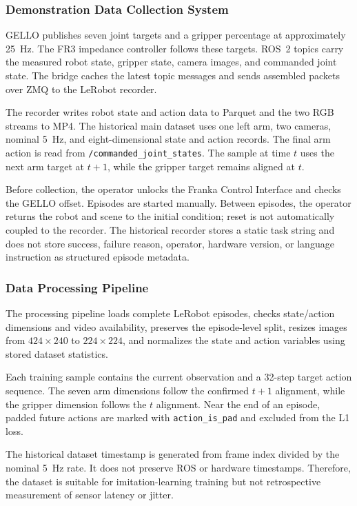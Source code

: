 \documentclass[12pt, letterpaper]{article}
\begin{document}
\subsubsection{Demonstration Data Collection System}

GELLO publishes seven joint targets and a gripper percentage at approximately 25~Hz. The FR3 impedance controller follows these targets. ROS~2 topics carry the measured robot state, gripper state, camera images, and commanded joint state. The bridge caches the latest topic messages and sends assembled packets over ZMQ to the LeRobot recorder.

The recorder writes robot state and action data to Parquet and the two RGB streams to MP4. The historical main dataset uses one left arm, two cameras, nominal 5~Hz, and eight-dimensional state and action records. The final arm action is read from \texttt{/commanded\_joint\_states}. The sample at time \(t\) uses the next arm target at \(t+1\), while the gripper target remains aligned at \(t\).

Before collection, the operator unlocks the Franka Control Interface and checks the GELLO offset. Episodes are started manually. Between episodes, the operator returns the robot and scene to the initial condition; reset is not automatically coupled to the recorder. The historical recorder stores a static task string and does not store success, failure reason, operator, hardware version, or language instruction as structured episode metadata.

\subsubsection{Data Processing Pipeline}

The processing pipeline loads complete LeRobot episodes, checks state/action dimensions and video availability, preserves the episode-level split, resizes images from \(424\times240\) to \(224\times224\), and normalizes the state and action variables using stored dataset statistics.

Each training sample contains the current observation and a 32-step target action sequence. The seven arm dimensions follow the confirmed \(t+1\) alignment, while the gripper dimension follows the \(t\) alignment. Near the end of an episode, padded future actions are marked with \texttt{action\_is\_pad} and excluded from the L1 loss.

The historical dataset timestamp is generated from frame index divided by the nominal 5~Hz rate. It does not preserve ROS or hardware timestamps. Therefore, the dataset is suitable for imitation-learning training but not retrospective measurement of sensor latency or jitter.
\end{document}
